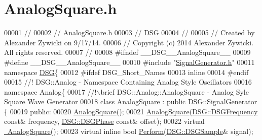 \hypertarget{_analog_square_8h_source}{\section{Analog\+Square.\+h}
\label{_analog_square_8h_source}
}

\begin{DoxyCode}
00001 \textcolor{comment}{//}
00002 \textcolor{comment}{//  AnalogSquare.h}
00003 \textcolor{comment}{//  DSG}
00004 \textcolor{comment}{//}
00005 \textcolor{comment}{//  Created by Alexander Zywicki on 9/17/14.}
00006 \textcolor{comment}{//  Copyright (c) 2014 Alexander Zywicki. All rights reserved.}
00007 \textcolor{comment}{//}
00008 \textcolor{preprocessor}{#ifndef \_\_DSG\_\_AnalogSquare\_\_}
00009 \textcolor{preprocessor}{#define \_\_DSG\_\_AnalogSquare\_\_}
00010 \textcolor{preprocessor}{#include "\hyperlink{_signal_generator_8h}{SignalGenerator.h}"}
00011 \textcolor{keyword}{namespace }\hyperlink{namespace_d_s_g}{DSG}\{
00012 \textcolor{preprocessor}{#ifdef DSG\_Short\_Names}
00013     \textcolor{keyword}{inline}
00014 \textcolor{preprocessor}{#endif}
00015 \textcolor{comment}{    //! DSG::Analog - Namespace Containing Analog Style Oscillators}
00016 \textcolor{comment}{}    \textcolor{keyword}{namespace }Analog\{\textcolor{comment}{}
00017 \textcolor{comment}{        //!\(\backslash\)brief DSG::Analog::AnalogSquare - Analog Syle Square Wave Generator}
\hypertarget{_analog_square_8h_source_l00018}{}\hyperlink{class_d_s_g_1_1_analog_1_1_analog_square}{00018} \textcolor{comment}{}        \textcolor{keyword}{class }\hyperlink{class_d_s_g_1_1_analog_1_1_analog_square}{AnalogSquare} : \textcolor{keyword}{public} \hyperlink{class_d_s_g_1_1_signal_generator}{DSG::SignalGenerator} \{
00019         \textcolor{keyword}{public}:
00020             \hyperlink{class_d_s_g_1_1_analog_1_1_analog_square_a7425ebd7e39129178eb050a04cd9d5d6}{AnalogSquare}();
00021             \hyperlink{class_d_s_g_1_1_analog_1_1_analog_square_a7425ebd7e39129178eb050a04cd9d5d6}{AnalogSquare}(\hyperlink{namespace_d_s_g_a4315a061386fa1014fda09b15d3a6973}{DSG::DSGFrequency} \textcolor{keyword}{const}& frequency,
      \hyperlink{namespace_d_s_g_a44431ce1eb0a7300efdd207bc879e52c}{DSG::DSGPhase} \textcolor{keyword}{const}& offset);
00022             \textcolor{keyword}{virtual} \hyperlink{class_d_s_g_1_1_analog_1_1_analog_square_a17b3928f19cb6bf0c151b5e1159de1db}{~AnalogSquare}();
00023             \textcolor{keyword}{virtual} \textcolor{keyword}{inline} \textcolor{keywordtype}{bool} \hyperlink{class_d_s_g_1_1_analog_1_1_analog_square_a784aa17d266704647789b972cf880e9f}{Perform}(\hyperlink{namespace_d_s_g_ac39a94cd27ebcd9c1e7502d0c624894a}{DSG::DSGSample}& signal);

\end{DoxyCode}
